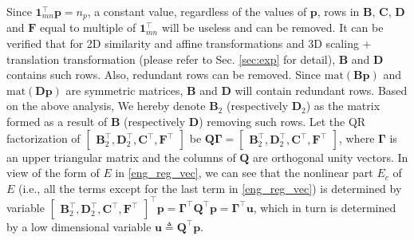 \documentclass[11pt,bezier,]{article}
\begin{document}
Since $\mathbf  1^\top_{mn} \mathbf  p=n_p$, a constant value,
regardless of the values of $\mathbf p$,
rows in $\mathbf B$, $\mathbf C$, $\mathbf D$ and $\mathbf F$
equal to multiple of $\mathbf  1^\top_{mn}$ will be useless
and can be removed.
It can be verified that for
2D similarity and affine transformations and 3D scaling + translation transformation
(please refer to Sec. \ref{sec:exp} for detail),
$\mathbf B$ and $\mathbf D$ contains such rows.
Also, redundant rows can  be removed.
Since $\text{mat}(\mathbf B\mathbf p)$ and $\text{mat}(\mathbf D\mathbf p)$ are symmetric matrices,
$\mathbf B$ and $\mathbf D$ will  contain redundant rows.
Based on the above analysis,
We hereby  denote $\mathbf B_2$ (respectively $\mathbf D_2$) 
as the matrix formed as a result of $\mathbf B$ (respectively $\mathbf D$) removing such  rows.
Let the QR factorization of $
\begin{bmatrix}
\mathbf  B_2^\top, \mathbf  D_2^\top, \mathbf C^\top, \mathbf F^\top
\end{bmatrix}
$ be
$
\mathbf Q\mathbf \Gamma=\begin{bmatrix}
 \mathbf B_2^\top , \mathbf D_2^\top, \mathbf C^\top, \mathbf F^\top
\end{bmatrix}
$,
where $\mathbf \Gamma$ is an upper triangular matrix 
and the columns of $\mathbf Q$ are orthogonal unity vectors.
In view of the form of $E$ in  \eqref{eng_reg_vec},
we can see  that the nonlinear part $E_{c}$ of $E$ 
(i.e., all the terms except for the last  term in \eqref{eng_reg_vec})  
is   determined by variable
$\begin{bmatrix}
 \mathbf B_2^\top , \mathbf D_2^\top,  \mathbf C^\top, \mathbf F^\top
\end{bmatrix}^\top\mathbf p = \mathbf \Gamma^\top \mathbf Q^\top\mathbf p = \mathbf \Gamma^\top\mathbf u$,
which in turn is determined by a low dimensional variable $\mathbf u\triangleq  \mathbf Q^\top\mathbf p$.
\end{document}
